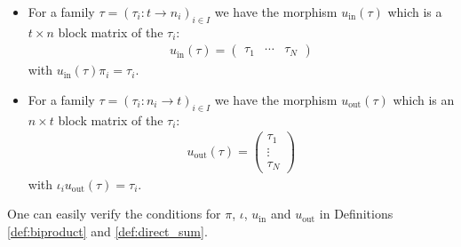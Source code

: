 \begin{example}
\begin{itemize}
\item For a family $\tau = (\tau_{i} : t \rightarrow n_{i})_{i\in I}$ we have the morphism $u_{\text{in}}(\tau)$ which is a $t \times n$ block matrix of
the $\tau_{i}$:
\begin{align}
u_{\text{in}}(\tau) = \label{eq:u_in_direct_sum_matrix}
\begin{pmatrix}
\tau_{1} & \cdots & \tau_{N}
\end{pmatrix}
\end{align}
with $u_{\text{in}}(\tau) \pi_{i} = \tau_{i}$.
\item For a family $\tau = (\tau_{i} : n_{i} \rightarrow t)_{i \in I}$ we have the morphism $u_{\text{out}}(\tau)$ which is an $n \times t$ block matrix
of the $\tau_{i}$:
\begin{align}
u_{\text{out}}(\tau) = \label{eq:u_out_direct_sum_matrix}
\begin{pmatrix}
\tau_{1} \\
\vdots \\
\tau_{N}
\end{pmatrix}
\end{align}
with $\iota_{i} u_{\text{out}}(\tau) = \tau_{i}$.
\end{itemize}
One can easily verify the conditions for $\pi$, $\iota$, $u_{\text{in}}$ and $u_{\text{out}}$ in Definitions \ref{def:biproduct} and \ref{def:direct_sum}.
\end{example}

